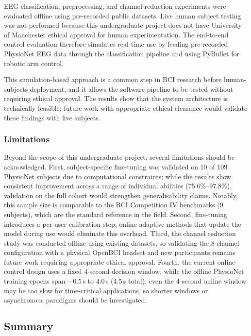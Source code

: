 \documentclass[12pt, a4paper]{article}
\begin{document}
EEG classification, preprocessing, and channel-reduction experiments were evaluated offline using pre-recorded public datasets. Live human subject testing was not performed because this undergraduate project does not have University of Manchester ethical approval for human experimentation. The end-to-end control evaluation therefore simulates real-time use by feeding pre-recorded PhysioNet EEG data through the classification pipeline and using PyBullet for robotic arm control.

This simulation-based approach is a common step in BCI research before human-subjects deployment, and it allows the software pipeline to be tested without requiring ethical approval. The results show that the system architecture is technically feasible; future work with appropriate ethical clearance would validate these findings with live subjects.

\subsubsection{Limitations}
\label{sec:disc_limitations}

Beyond the scope of this undergraduate project, several limitations should be acknowledged. First, subject-specific fine-tuning was validated on 10 of 109 PhysioNet subjects due to computational constraints; while the results show consistent improvement across a range of individual abilities (75.6\%--97.8\%), validation on the full cohort would strengthen generalisability claims. Notably, this sample size is comparable to the BCI Competition IV benchmarks (9 subjects), which are the standard reference in the field. Second, fine-tuning introduces a per-user calibration step; online adaptive methods that update the model during use would eliminate this overhead. Third, the channel reduction study was conducted offline using existing datasets, so validating the 8-channel configuration with a physical OpenBCI headset and new participants remains future work requiring appropriate ethical approval. Fourth, the current online-control design uses a fixed 4-second decision window, while the offline PhysioNet training epochs span $-0.5$\,s to $4.0$\,s (4.5\,s total); even the 4-second online window may be too slow for time-critical applications, so shorter windows or asynchronous paradigms should be investigated.

\subsection{Summary}
\end{document}
